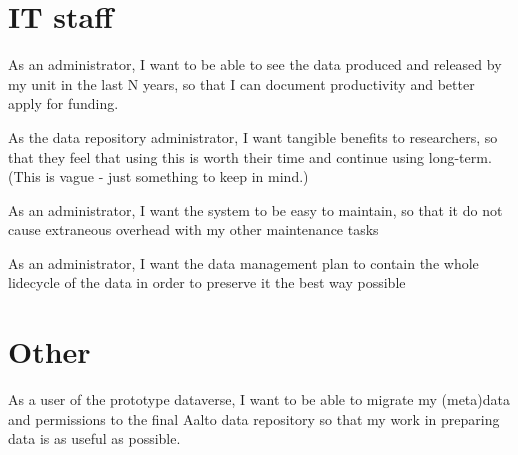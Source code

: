 \section{IT staff}

\begin{compactitem}
    \item As an administrator, I want to be able to see the data produced and
          released by my unit in the last N years, so that I can document
          productivity and better apply for funding.
    \item As the data repository administrator, I want tangible benefits to
          researchers, so that they feel that using this is worth their time and
          continue using long-term.  (This is vague - just something to keep in
          mind.)
    \item As an administrator, I want the system to be easy to maintain, so
          that it do not cause extraneous overhead with my other maintenance
          tasks
    \item As an administrator, I want the data management plan to contain the
          whole lidecycle of the data in order to preserve it the best way
          possible
\end{compactitem}

\section{Other}

\begin{compactitem}
    \item As a user of the prototype dataverse, I want to be able to migrate my
          (meta)data and permissions to the final Aalto data repository so that
          my work in preparing data is as useful as possible.
\end{compactitem}




\iffalse
This is the first appendix. You could put some test images or verbose data in an
appendix, if there is too much data to fit in the actual text nicely.

For now, the Aalto logo variants are shown in Figure~\ref{fig:aaltologo}.

\begin{figure}
\begin{center}
 \begin{subfigure}[b]{\textwidth}
  {\selectlanguage{english}\AaltoLogoSmall{1}{!}{aaltoBlue}}
  \caption{In English}
 \end{subfigure}
 \begin{subfigure}[b]{\textwidth}
  {\selectlanguage{finnish}\AaltoLogoSmall{1}{''}{aaltoRed}}
  \caption{Suomeksi}
 \end{subfigure}
 \begin{subfigure}[b]{\textwidth}
  {\selectlanguage{swedish}\AaltoLogoSmall{1}{?}{aaltoYellow}}
  \caption{P\r{a} svenska}
 \end{subfigure}
\caption{Aalto logo variants}
\label{fig:aaltologo}
\end{center}
\end{figure}
\fi

